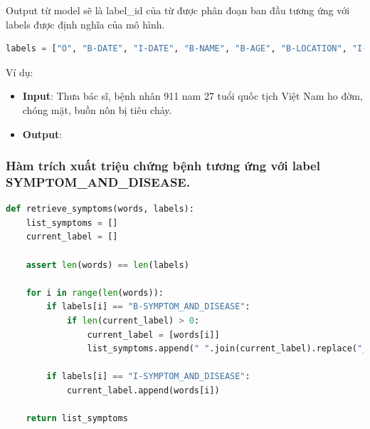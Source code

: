 Output từ model sẽ là label\_id của từ được phân đoạn ban đầu tương ứng với labels được định nghĩa của mô hình.
\begin{lstlisting}[language=Python]
labels = ["O", "B-DATE", "I-DATE", "B-NAME", "B-AGE", "B-LOCATION", "I-LOCATION", "B-JOB", "I-JOB","B-ORGANIZATION", "I-ORGANIZATION", "B-PATIENT_ID", "B-SYMPTOM_AND_DISEASE", "I-SYMPTOM_AND_DISEASE","B-GENDER", "B-TRANSPORTATION", "I-TRANSPORTATION", "I-NAME", "I-PATIENT_ID", "I-AGE", "I-GENDER"]
\end{lstlisting}
Ví dụ:
\begin{itemize}
    \item \textbf{Input}: Thưa bác sĩ, bệnh nhân 911 nam 27 tuổi quốc tịch Việt Nam ho đờm, chóng mặt, buồn nôn bị tiêu chảy.
    \item \textbf{Output}:
\end{itemize}

\subsubsection{Hàm trích xuất triệu chứng bệnh tương ứng với label \textbf{SYMPTOM\_AND\_DISEASE}.}
\begin{lstlisting}[language=Python]
def retrieve_symptoms(words, labels):
    list_symptoms = []
    current_label = []

    assert len(words) == len(labels)

    for i in range(len(words)):
        if labels[i] == "B-SYMPTOM_AND_DISEASE":
            if len(current_label) > 0:
                current_label = [words[i]]
                list_symptoms.append(" ".join(current_label).replace("_", " "))

        if labels[i] == "I-SYMPTOM_AND_DISEASE":
            current_label.append(words[i])

    return list_symptoms
\end{lstlisting}
